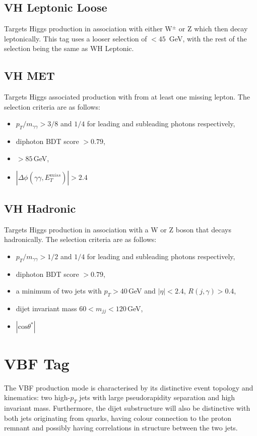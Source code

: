 \subsection{VH Leptonic Loose}
Targets Higgs production in association with either W$^{\pm}$ or Z which then decay leptonically. This tag uses a looser \MET selection of \MET$ < 45$\, GeV, with the rest of the selection being the same as WH Leptonic.

\subsection{VH MET}
Targets Higgs associated production with \MET from at least one missing lepton. The selection criteria are as follows:
\begin{itemize}[leftmargin=.5in,noitemsep]
    \item $p_{T}/m_{\gamma\gamma} > 3/8$ and $1/4$ for leading and subleading photons respectively,
    \item diphoton BDT score $> 0.79$,
    \item \MET$> 85$\,GeV,
    \item $|\Delta\phi(\gamma\gamma,E_{T}^{miss})| > 2.4$
\end{itemize}


\subsection{VH Hadronic}
Targets Higgs production in association with a W or Z boson that decays hadronically. The selection criteria are as follows:
\begin{itemize}[leftmargin=.5in,noitemsep]
    \item $p_{T}/m_{\gamma\gamma} > 1/2$ and $1/4$ for leading and subleading photons respectively, 
    \item diphoton BDT score $> 0.79$,
    \item a minimum of two jets with $p_T > 40$\,GeV and $|\eta| < 2.4$, $R(j,\gamma) > 0.4$,
    \item dijet invariant mass $60 < m_{jj} < 120$\,GeV,
    \item $|\mathrm{cos}{\theta^{*}}|$
\end{itemize}













\section{VBF Tag}
The VBF production mode is characterised by its distinctive event topology and kinematics: two high-$p_{T}$ jets with large pseudorapidity separation and high invariant mass. Furthermore, the dijet substructure will also be distinctive with both jets originating from quarks, having colour connection to the proton remnant and possibly having correlations in structure between the two jets. 

